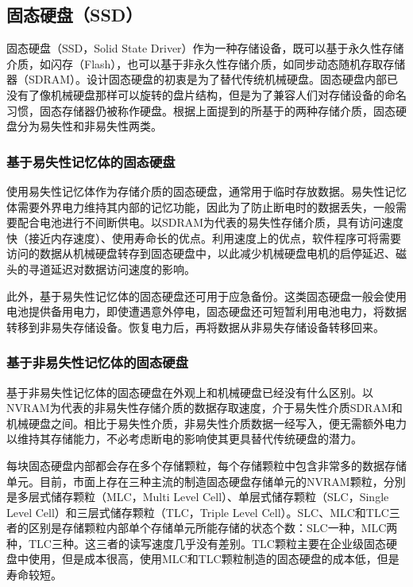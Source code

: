 \subsection{固态硬盘（SSD）}
固态硬盘\cite{ssd2009}（SSD，Solid State Driver）作为一种存储设备，既可以基于永久性存储介质，如闪存（Flash），也可以基于非永久性存储介质，如同步动态随机存取存储器（SDRAM）。设计固态硬盘的初衷是为了替代传统机械硬盘。固态硬盘内部已没有了像机械硬盘那样可以旋转的盘片结构，但是为了兼容人们对存储设备的命名习惯，固态存储器仍被称作硬盘。根据上面提到的所基于的两种存储介质，固态硬盘分为易失性和非易失性两类。

\subsubsection{基于易失性记忆体的固态硬盘}

使用易失性记忆体作为存储介质的固态硬盘，通常用于临时存放数据。易失性记忆体需要外界电力维持其内部的记忆功能，因此为了防止断电时的数据丢失，一般需要配合电池进行不间断供电。以SDRAM为代表的易失性存储介质，具有访问速度快（接近内存速度）、使用寿命长的优点。利用速度上的优点，软件程序可将需要访问的数据从机械硬盘转存到固态硬盘中，以此减少机械硬盘电机的启停延迟、磁头的寻道延迟对数据访问速度的影响。

此外，基于易失性记忆体的固态硬盘还可用于应急备份。这类固态硬盘一般会使用电池提供备用电力，即使遭遇意外停电，固态硬盘还可短暂利用电池电力，将数据转移到非易失存储设备。恢复电力后，再将数据从非易失存储设备转移回来。

\subsubsection{基于非易失性记忆体的固态硬盘}

基于非易失性记忆体的固态硬盘在外观上和机械硬盘已经没有什么区别。以NVRAM为代表的非易失性存储介质的数据存取速度，介于易失性介质SDRAM和机械硬盘之间。相比于易失性介质，非易失性介质数据一经写入，便无需额外电力以维持其存储能力，不必考虑断电的影响使其更具替代传统硬盘的潜力。

每块固态硬盘内部都会存在多个存储颗粒，每个存储颗粒中包含非常多的数据存储单元。目前，市面上存在三种主流的制造固态硬盘存储单元的NVRAM颗粒，分別是多层式储存颗粒（MLC，Multi Level Cell）、单层式储存颗粒（SLC，Single Level Cell）和三层式储存颗粒（TLC，Triple Level Cell）。SLC、MLC和TLC三者的区别是存储颗粒内部单个存储单元所能存储的状态个数：SLC一种，MLC两种，TLC三种。这三者的读写速度几乎没有差别。TLC颗粒主要在企业级固态硬盘中使用，但是成本很高，使用MLC和TLC颗粒制造的固态硬盘的成本低，但是寿命较短。

